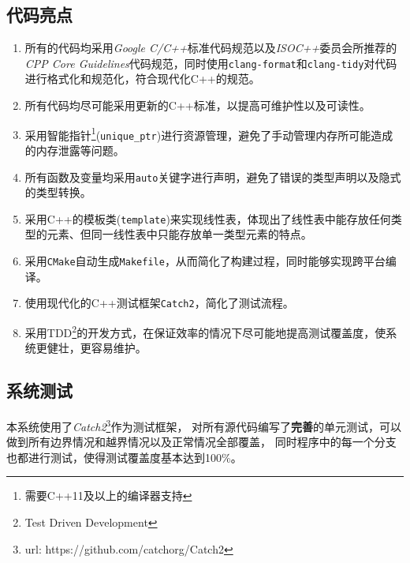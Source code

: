 \subsection{代码亮点}
\begin{enumerate}
        \item 所有的代码均采用\emph{Google
            C/C++}标准代码规范以及\emph{ISOC++}委员会所推荐的\emph{CPP Core Guidelines}代码规范，同时使用\texttt{clang-format}和\texttt{clang-tidy}对代码进行格式化和规范化，符合现代化C++的规范。
        \item 所有代码均尽可能采用更新的C++标准，以提高可维护性以及可读性。
        \item 采用智能指针\footnote{需要C++11及以上的编译器支持}(\texttt{unique\_ptr})进行资源管理，避免了手动管理内存所可能造成的内存泄露等问题。
        \item 所有函数及变量均采用\texttt{auto}关键字进行声明，避免了错误的类型声明以及隐式的类型转换。
        \item 采用C++的模板类(\texttt{template})来实现线性表，体现出了线性表中能存放任何类型的元素、但同一线性表中只能存放单一类型元素的特点。
        \item 采用\texttt{CMake}自动生成\texttt{Makefile}，从而简化了构建过程，同时能够实现跨平台编译。
        \item 使用现代化的C++测试框架\texttt{Catch2}，简化了测试流程。
        \item 采用TDD\footnote{Test Driven Development}的开发方式，在保证效率的情况下尽可能地提高测试覆盖度，使系统更健壮，更容易维护。
\end{enumerate}

\subsection{系统测试}
本系统使用了\textit{Catch2}\footnote{url: https://github.com/catchorg/Catch2}作为测试框架，
对所有源代码编写了\textbf{完善}的单元测试，可以做到所有边界情况和越界情况以及正常情况全部覆盖，
同时程序中的每一个分支也都进行测试，使得测试覆盖度基本达到100\%。
